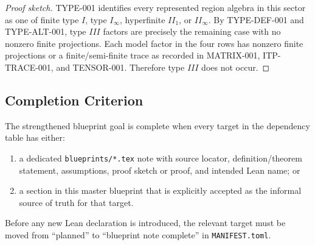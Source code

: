 \documentclass{article}
\begin{document}
\begin{proof}[Proof sketch]
TYPE-001 identifies every represented region algebra in this sector as one of
finite type \(I\), type \(I_\infty\), hyperfinite \(II_1\), or \(II_\infty\).
By TYPE-DEF-001 and TYPE-ALT-001, type \(III\) factors are precisely the
remaining case with no nonzero finite projections.  Each model factor in the
four rows has nonzero finite projections or a finite/semi-finite trace as
recorded in MATRIX-001, ITP-TRACE-001, and TENSOR-001.  Therefore type \(III\)
does not occur.
\end{proof}

\subsection*{Completion Criterion}

The strengthened blueprint goal is complete when every target in the
dependency table has either:
\begin{enumerate}
\item a dedicated \texttt{blueprints/*.tex} note with source locator,
definition/theorem statement, assumptions, proof sketch or proof, and intended
Lean name; or
\item a section in this master blueprint that is explicitly accepted as the
informal source of truth for that target.
\end{enumerate}
Before any new Lean declaration is introduced, the relevant target must be
moved from ``planned'' to ``blueprint note complete'' in \texttt{MANIFEST.toml}.
\end{document}
